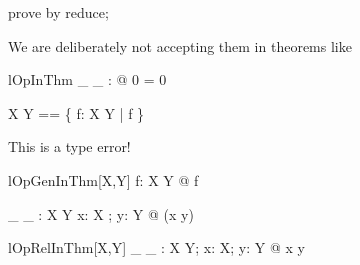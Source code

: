 \begin{zproof}[S\$domainCheck]
prove by reduce;
\end{zproof}

We are deliberately not accepting them in theorems like
\begin{theorem}{lOpInThm}
  \forall \_ \middle \_ : \nat \cross \nat \fun \nat @ 0  = 0
\end{theorem}

\begin{zed}
   X \zevesgen Y == \{ f: X \fun Y | f \neq \emptyset \}
\end{zed}

This is a type error!
\begin{theorem}{lOpGenInThm}[X,Y]
   \forall f: X \zevesthmgen Y @ f \neq \emptyset
\end{theorem}

\begin{gendef}[X, Y]
   \_ \zevesrel \_ : X \rel Y
\where
   \forall x: X ; y: Y @ (x \zevesrel y)
\end{gendef}

\begin{theorem}{lOpRelInThm}[X,Y]
   \forall \_ \zevesthmrel \_ : X \rel Y; x: X; y: Y @ x \zevesthmrel y
\end{theorem}
